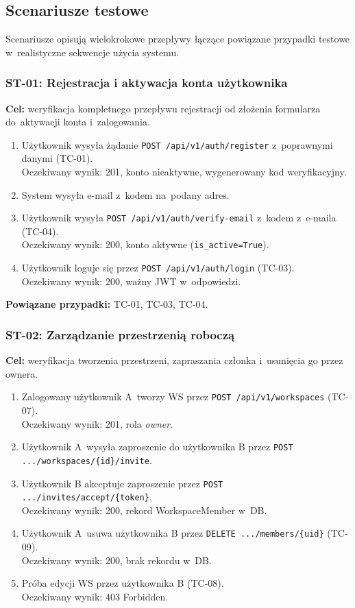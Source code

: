 \documentclass[12pt,a4paper]{article}
\begin{document}
\subsection{Scenariusze testowe}

Scenariusze opisują wielokrokowe przepływy łączące powiązane przypadki testowe w~realistyczne sekwencje użycia systemu.

\subsubsection{ST-01: Rejestracja i aktywacja konta użytkownika}

\textbf{Cel:} weryfikacja kompletnego przepływu rejestracji od złożenia formularza do~aktywacji konta i~zalogowania.

\begin{enumerate}
  \item Użytkownik wysyła żądanie \texttt{POST /api/v1/auth/register} z~poprawnymi danymi (TC-01). \\ Oczekiwany wynik: 201, konto nieaktywne, wygenerowany kod weryfikacyjny.
  \item System wysyła e-mail z~kodem na~podany adres.
  \item Użytkownik wysyła \texttt{POST /api/v1/auth/verify-email} z~kodem z~e-maila (TC-04). \\ Oczekiwany wynik: 200, konto aktywne (\texttt{is\_active=True}).
  \item Użytkownik loguje się przez \texttt{POST /api/v1/auth/login} (TC-03). \\ Oczekiwany wynik: 200, ważny JWT w~odpowiedzi.
\end{enumerate}

\textbf{Powiązane przypadki:} TC-01, TC-03, TC-04.

\subsubsection{ST-02: Zarządzanie przestrzenią roboczą}

\textbf{Cel:} weryfikacja tworzenia przestrzeni, zapraszania członka i~usunięcia go przez ownera.

\begin{enumerate}
  \item Zalogowany użytkownik A~tworzy WS przez \texttt{POST /api/v1/workspaces} (TC-07). \\ Oczekiwany wynik: 201, rola \emph{owner}.
  \item Użytkownik A~wysyła zaproszenie do użytkownika B przez \texttt{POST .../workspaces/\{id\}/invite}.
  \item Użytkownik B akceptuje zaproszenie przez \texttt{POST .../invites/accept/\{token\}}. \\ Oczekiwany wynik: 200, rekord WorkspaceMember w~DB.
  \item Użytkownik A~usuwa użytkownika B przez \texttt{DELETE .../members/\{uid\}} (TC-09). \\ Oczekiwany wynik: 200, brak rekordu w~DB.
  \item Próba edycji WS przez użytkownika B (TC-08). \\ Oczekiwany wynik: 403 Forbidden.
\end{enumerate}
\end{document}
